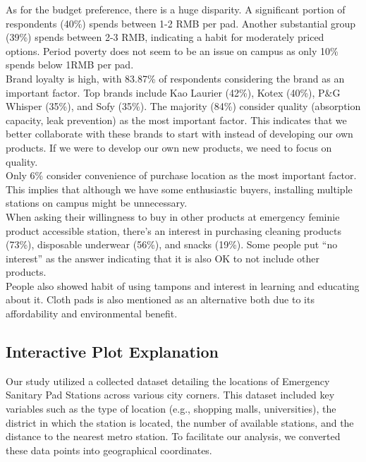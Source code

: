 As for the budget preference, there is a huge disparity. A significant portion of respondents (40\%) spends between 1-2 RMB per pad. Another substantial group (39\%) spends between 2-3 RMB, indicating a habit for moderately priced options. Period poverty does not seem to be an issue on campus as only 10\% spends below 1RMB per pad.\\

Brand loyalty is high, with 83.87\% of respondents considering the brand as an important factor. Top brands include Kao Laurier (42\%), Kotex (40\%), P\&G Whisper (35\%), and Sofy (35\%). The majority (84\%) consider quality (absorption capacity, leak prevention) as the most important factor. This indicates that we better collaborate with these brands to start with instead of developing our own products. If we were to develop our own new products, we need to focus on quality.\\

Only 6\% consider convenience of purchase location as the most important factor. This implies that although we have some enthusiastic buyers, installing multiple stations on campus might be unnecessary.\\

When asking their willingness to buy in other products at emergency feminie product accessible station, there's an interest in purchasing cleaning products (73\%), disposable underwear (56\%), and snacks (19\%). Some people put “no interest” as the answer indicating that it is also OK to not include other products.\\

People also showed habit of using tampons and interest in learning and educating about it.
Cloth pads is also mentioned as an alternative both due to its affordability and environmental benefit.

\subsection{Interactive Plot Explanation}
Our study utilized a collected dataset detailing the locations of Emergency Sanitary Pad Stations across various city corners. This dataset included key variables such as the type of location (e.g., shopping malls, universities), the district in which the station is located, the number of available stations, and the distance to the nearest metro station. To facilitate our analysis, we converted these data points into geographical coordinates.\\

